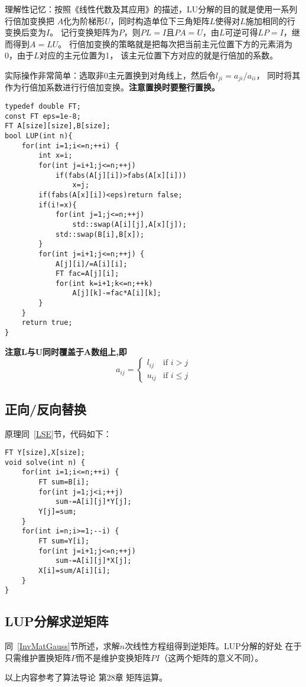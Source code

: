 理解性记忆：按照《线性代数及其应用》的描述，LU分解的目的就是使用一系列行倍加变换把
$A$化为阶梯形$U$，同时构造单位下三角矩阵$L$使得对$L$施加相同的行变换后变为$I$。
记行变换矩阵为$P$，则$PL=I$且$PA=U$，由$L$可逆可得$LP=I$，继而得到$A=LU$。
行倍加变换的策略就是把每次把当前主元位置下方的元素消为0，由于$L$对应的主元位置为1，
该主元位置下方对应的就是行倍加的系数。

实际操作非常简单：选取非0主元置换到对角线上，然后令$l_{ji}=a_{ji}/a_{ii}$，
同时将其作为行倍加系数进行行倍加变换。{\bfseries 注意置换时要整行置换。}

\begin{lstlisting}
typedef double FT;
const FT eps=1e-8;
FT A[size][size],B[size];
bool LUP(int n){
    for(int i=1;i<=n;++i) {
        int x=i;
        for(int j=i+1;j<=n;++j)
            if(fabs(A[j][i])>fabs(A[x][i]))
                x=j;
        if(fabs(A[x][i])<eps)return false;
        if(i!=x){
            for(int j=1;j<=n;++j)
                std::swap(A[i][j],A[x][j]);
            std::swap(B[i],B[x]);
        }
        for(int j=i+1;j<=n;++j) {
            A[j][i]/=A[i][i];
            FT fac=A[j][i];
            for(int k=i+1;k<=n;++k)
                A[j][k]-=fac*A[i][k];
        }
    }
    return true;
}
\end{lstlisting}
{\bfseries 注意L与U同时覆盖于A数组上,即}
\begin{displaymath}
	a_{ij}=\left\{\begin{array}{ll}
		l_{ij} & \textrm{if $i>j$}     \\
		u_{ij} & \textrm{if $i\leq j$}
	\end{array}\right.
\end{displaymath}
\subsection{正向/反向替换}
原理同~\ref{LSE}节，代码如下：
\begin{lstlisting}
FT Y[size],X[size];
void solve(int n) {
    for(int i=1;i<=n;++i) {
        FT sum=B[i];
        for(int j=1;j<i;++j)
            sum-=A[i][j]*Y[j];
        Y[j]=sum;
    }
    for(int i=n;i>=1;--i) {
        FT sum=Y[i];
        for(int j=i+1;j<=n;++j)
            sum-=A[i][j]*X[j];
        X[i]=sum/A[i][i];
    }
}
\end{lstlisting}
\subsection{LUP分解求逆矩阵}
同~\ref{InvMatGauss}节所述，求解$n$次线性方程组得到逆矩阵。LUP分解的好处
在于只需维护置换矩阵$P$而不是维护变换矩阵$PI$（这两个矩阵的意义不同）。


以上内容参考了算法导论\cite{ITA3} 第28章 矩阵运算。
